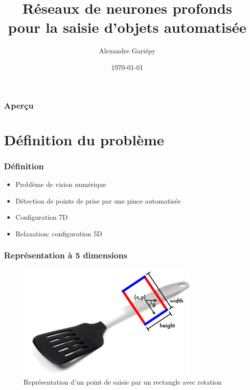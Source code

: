 \documentclass{beamer}
\title[Réseaux de neurones pour saisie automatique]{Réseaux de neurones profonds pour la saisie d'objets automatisée}
\author{Alexandre Gariépy}
\institute[ulaval] 
{
Université Laval \\
\medskip
\textit{alexandre.gariepy.2@ulaval.ca}
}
\date{\today}
\begin{document}
\begin{frame}
\titlepage
\end{frame}

\begin{frame}
\frametitle{Aperçu}
\tableofcontents 
\end{frame}

\section{Définition du problème}
\begin{frame}
  \frametitle{Définition}
  \begin{itemize}
  \item Problème de vision numérique
  \item Détection de points de prise par une pince automatisée
  \item Configuration 7D
  \item Relaxation: configuration 5D
  \end{itemize}
  
\end{frame}

\begin{frame}
  \frametitle{Représentation à 5 dimensions}
  \begin{figure}
    \centering
    \includegraphics[width=0.8\textwidth]{img/grasp_rectangle.png}
    \caption{Représentation d'un point de saisie par un rectangle avec rotation}
    \label{fig:grasp_rect}
  \end{figure}
\end{frame}
\end{document}
